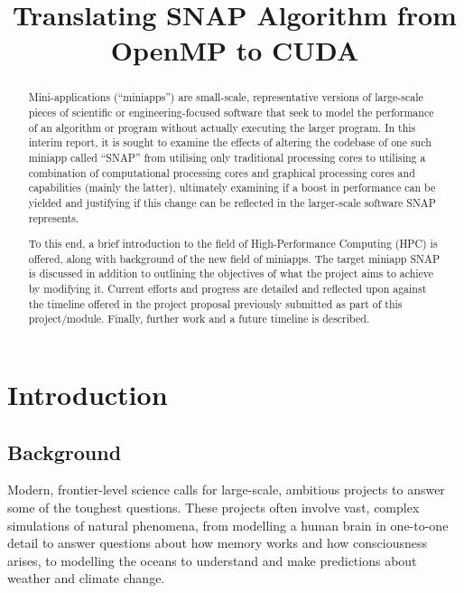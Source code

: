 \documentclass[conference]{IEEEtran}
\begin{document}
\title{Translating SNAP Algorithm from OpenMP to CUDA}

\author{
}

\maketitle


\begin{abstract}

Mini-applications (``miniapps'') are small-scale, representative versions of large-scale pieces of scientific or engineering-focused software that seek to model the performance of an algorithm or program without actually executing the larger program. In this interim report, it is sought to examine the effects of altering the codebase of one such miniapp called ``SNAP'' from utilising only traditional processing cores to utilising a combination of computational processing cores and graphical processing cores and capabilities (mainly the latter), ultimately examining if a boost in performance can be yielded and justifying if this change can be reflected in the larger-scale software SNAP represents.

To this end, a brief introduction to the field of High-Performance Computing (HPC) is offered, along with background of the new field of miniapps. The target miniapp SNAP is discussed in addition to outlining the objectives of what the project aims to achieve by modifying it. Current efforts and progress are detailed and reflected upon against the timeline offered in the project proposal previously submitted as part of this project/module. Finally, further work and a future timeline is described.

\end{abstract}


\section{Introduction}

\subsection{Background}

Modern, frontier-level science calls for large-scale, ambitious projects to answer some of the toughest questions. These projects often involve vast, complex simulations of natural phenomena, from modelling a human brain in one-to-one detail to answer questions about how memory works and how consciousness arises, to modelling the oceans to understand and make predictions about weather and climate change.
\end{document}
